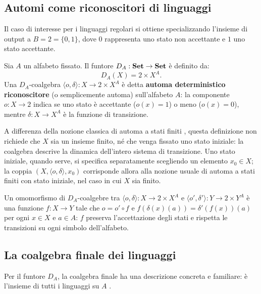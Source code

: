\subsection{Automi come riconoscitori di linguaggi}

Il caso di interesse per i linguaggi regolari si ottiene specializzando l'insieme di output a \(B = 2 = \{0, 1\}\), dove \(0\) rappresenta uno stato non accettante e \(1\) uno stato accettante.

\begin{definition}
  Sia \(A\) un alfabeto fissato. Il funtore \(D_A : \operatorname{\mathbf{Set}} \to \operatorname{\mathbf{Set}}\) è definito da:
  \[
    D_A(X) = 2 \times X^A.
  \]
  Una \(D_A\)-coalgebra \(\langle o, \delta \rangle : X \to 2 \times X^A\) è detta \textbf{automa deterministico riconoscitore} (o semplicemente automa) sull'alfabeto \(A\): la componente \(o : X \to 2\) indica se uno stato è accettante (\(o(x) = 1\)) o meno (\(o(x) = 0\)), mentre \(\delta : X \to X^A\) è la funzione di transizione.
\end{definition}

A differenza della nozione classica di automa a stati finiti \cite{hopcroft2006,sipser2013}, questa definizione non richiede che \(X\) sia un insieme finito, né che venga fissato uno stato iniziale: la coalgebra descrive la dinamica dell'intero sistema di transizione. Uno stato iniziale, quando serve, si specifica separatamente scegliendo un elemento \(x_0 \in X\); la coppia \((X, \langle o, \delta\rangle, x_0)\) corrisponde allora alla nozione usuale di automa a stati finiti con stato iniziale, nel caso in cui \(X\) sia finito.

Un omomorfismo di \(D_A\)-coalgebre tra \(\langle o, \delta \rangle : X \to 2 \times X^A\) e \(\langle o', \delta' \rangle : Y \to 2 \times Y^A\) è una funzione \(f : X \to Y\) tale che \(o = o' \circ f\) e \(f(\delta(x)(a)) = \delta'(f(x))(a)\) per ogni \(x \in X\) e \(a \in A\): \(f\) preserva l'accettazione degli stati e rispetta le transizioni su ogni simbolo dell'alfabeto.

\subsection{La coalgebra finale dei linguaggi}

Per il funtore \(D_A\), la coalgebra finale ha una descrizione concreta e familiare: è l'insieme di tutti i linguaggi su \(A\) \cite{jacobs2017,rutten2000}.

